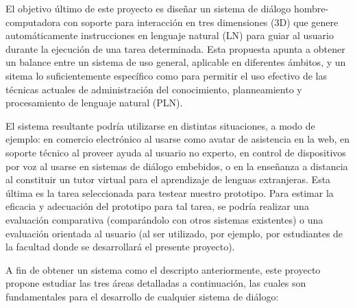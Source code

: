 
El objetivo \'ultimo de este proyecto es dise\~nar un sistema de di\'alogo hombre-computadora con soporte para interacci\'on en tres dimensiones (3D) que genere autom\'aticamente instrucciones en lenguaje natural (LN) para guiar  al usuario durante la ejecuci\'on de una tarea determinada. Esta propuesta apunta
a obtener un balance entre un sistema de uso general, aplicable en
diferentes \'ambitos, y un sitema lo suficientemente espec\'ifico
como para permitir el uso efectivo de las t\'ecnicas actuales de
administraci\'on del conocimiento, planneamiento y procesamiento de lenguaje natural (PLN).

El sistema resultante podr\'ia utilizarse en distintas situaciones, a modo de ejemplo:
en comercio electr\'onico  al usarse como avatar de asistencia en la web, en soporte t\'ecnico al proveer ayuda al usuario no experto, en
control de dispositivos por voz al usarse en sistemas de di\'alogo embebidos, o
en la ense\~nanza a distancia al constituir un tutor virtual para el aprendizaje de lenguas extranjeras. Esta \'ultima es la tarea seleccionada para testear nuestro prototipo. Para estimar la eficacia y adecuaci\'on del prototipo para tal tarea, se podr\'ia realizar una evaluaci\'on comparativa (compar\'andolo con otros sistemas existentes) o una evaluaci\'on orientada al usuario (al ser utilizado, por ejemplo, por estudiantes de la facultad donde se desarrollar\'a el presente proyecto).


A fin de obtener un sistema como el descripto anteriormente, este proyecto propone estudiar las tres \'areas detalladas a continuaci\'on, las cuales son  fundamentales para el desarrollo de cualquier sistema de di\'alogo:

